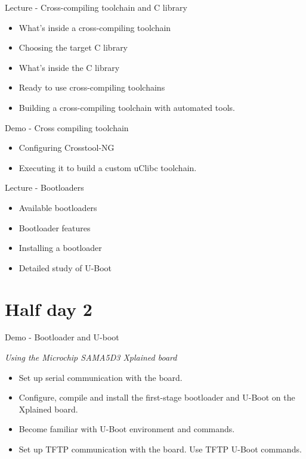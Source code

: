 \documentclass[a4paper,12pt,obeyspaces,spaces,hyphens]{article}
\begin{document}
\feagendatwocolumn
{Lecture - Cross-compiling toolchain and C library}
{
  \begin{itemize}
  \item What's inside a cross-compiling toolchain
  \item Choosing the target C library
  \item What's inside the C library
  \item Ready to use cross-compiling toolchains
  \item Building a cross-compiling toolchain with automated tools.
  \end{itemize}
}
{Demo - Cross compiling toolchain}
{
  \begin{itemize}
  \item Configuring Crosstool-NG
  \item Executing it to build a custom uClibc toolchain.
  \end{itemize}
}

\feagendaonecolumn
{Lecture - Bootloaders}
{
  \begin{itemize}
  \item Available bootloaders
  \item Bootloader features
  \item Installing a bootloader
  \item Detailed study of U-Boot
  \end{itemize}
}

\section{Half day 2}

\feagendaonecolumn
{Demo - Bootloader and U-boot}
{
  {\em Using the Microchip SAMA5D3 Xplained board}
  \begin{itemize}
  \item Set up serial communication with the board.
  \item Configure, compile and install the first-stage bootloader
        and U-Boot on the Xplained board.
  \item Become familiar with U-Boot environment and commands.
  \item Set up TFTP communication with the board. Use TFTP U-Boot commands.
  \end{itemize}
}
\end{document}
